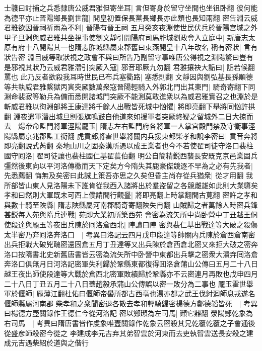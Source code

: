 士彠曰討捕之兵悉隸唐公威君雅但寄坐耳|{
	言但寄身於留守坐間也坐徂卧翻}
彼何能為德平亦止晉陽鄉長劉世龍|{
	開皇初置保長黨長鄉長亦此類也長知兩翻}
密告淵云威君雅欲因晉祠祈雨為不利|{
	晉陽有晉王祠}
五月癸亥夜淵使世民伏兵於晉陽宫城之外甲子旦淵與威君雅共坐視事使劉文靜引開陽府司馬胙城劉政會入立庭中|{
	新唐志太原有府十八開陽其一也隋志胙城縣屬東郡舊曰東燕開皇十八年改名}
稱有密狀|{
	言有狀告密}
淵目威等取狀視之政會不與曰所告乃副留守事唯唐公得視之淵陽驚曰豈有是邪視其狀乃云威君雅濳引突厥入寇|{
	邪音耶厥九勿翻}
君雅攘袂大詬曰|{
	詬若候翻罵也}
此乃反者欲殺我耳時世民已布兵塞衢路|{
	塞悉則翻}
文靜因與劉弘基長孫順德等共執威君雅繫獄丙寅突厥數萬衆寇晉陽輕騎入外郭北門出其東門|{
	騎奇寄翻下同}
淵命裴寂等勒兵為備而悉開諸城門突厥不能測莫敢進衆以為威君雅實召之也淵於是斬威君雅以徇淵部將王康達將千餘人出戰皆死城中忷懼|{
	將即亮翻下舉將同忷許拱翻}
淵夜遣軍濳出城旦則張旗鳴鼓自他道來如援軍者突厥終疑之留城外二日大掠而去　煬帝命監門將軍涇陽龎玉|{
	隋志左右監門府各將軍一人掌宫殿門禁及守衛事涇陽縣屬京兆郡監工銜翻}
虎賁郎將霍世舉將關内兵援東都柴孝和說李密曰|{
	賁音奔將即亮翻說式芮翻}
秦地山川之固秦漢所憑以成王業者也今不若使翟司徒守洛口裴柱國守囘洛|{
	翟司徒讓也裴柱國仁基翟萇伯翻}
明公自簡精鋭西襲長安既克京邑業固兵彊然後東向以平河洛傳檄而天下定矣方今隋失其鹿豪傑競逐不早為之必有先我者|{
	先悉薦翻}
悔無及矣密曰此誠上策吾亦思之久矣但昏主尚存從兵猶衆|{
	從才用翻}
我所部皆山東人見洛陽未下誰肯從我西入諸將出於羣盗留之各競雌雄如此則大業隳矣孝和曰然則大軍既未可西上僕請間行觀舋|{
	將即亮翻上時掌翻間古莧翻}
密許之孝和與數十騎至陜縣|{
	隋志陜縣屬河南郡騎奇寄翻陜失冉翻}
山賊歸之者萬餘人時密兵鋒甚鋭每入苑與隋兵連戰|{
	苑即大業初所築西苑}
會密為流矢所中尚卧營中丁丑越王侗使段達與龎玉等夜出兵陳於囘洛倉西北|{
	陣讀曰陣}
密與裴仁基出戰達等大破之殺傷太半密乃弃囘洛奔洛口　|{
	考異曰洛記云四月戊申段達等帥關内兵陳於倉西倉南密出兵拒戰大破兇醜密還固倉五月丁丑達等又出兵陳於倉西倉北密又來拒大破之密奔洛口按隋書北史新舊唐書皆云密為流矢所中卧營中東都出兵擊之密衆大潰弃囘洛倉奔洛口俱無月日河洛記密軍失利歸於鞏縣東都復得囬洛倉蒲山公傳曰五月二十八日越王夜出師使段達等大戰於倉西北密軍敗績歸於鞏縣亦不云密連月再敗也戊申四月二十八日丁丑五月二十八日蓋趙毅承蒲山公傳誤以密一敗分為二事也}
龎玉霍世舉軍於偃師|{
	龎薄江翻杜佑曰偃師帝嚳所都古西亳也湯亦都之武王伐紂迴師息戎遂名偃師縣屬河南郡}
柴孝和之衆聞密退各散去孝和輕騎歸密楊德方鄭德韜皆死　|{
	考異曰楊德方壺關錄作王德仁今從河洛記}
密以鄭頲為左司馬|{
	頲它鼎翻}
滎陽鄭乾象為右司馬　|{
	考異曰隋唐書皆作䖍象唯壼關錄作乾象云密殺其兄乾覆乾覆之子會通後從盛彦師殺密今從之}
李建成李元吉弃其弟智雲於河東而去吏執智雲送長安殺之建成元吉遇柴紹於道與之偕行

